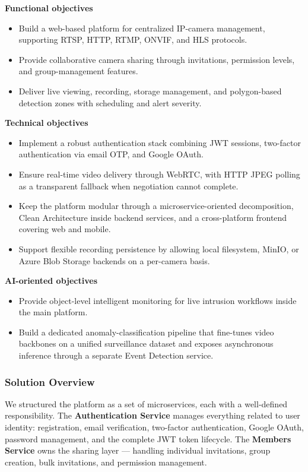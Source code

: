 \documentclass[12pt,a4paper,oneside]{report}
\begin{document}
\textbf{Functional objectives}
\begin{itemize}
  \item Build a web-based platform for centralized IP-camera management, supporting RTSP, HTTP, RTMP, ONVIF, and HLS protocols.
  \item Provide collaborative camera sharing through invitations, permission levels, and group-management features.
  \item Deliver live viewing, recording, storage management, and polygon-based detection zones with scheduling and alert severity.
\end{itemize}

\textbf{Technical objectives}
\begin{itemize}
  \item Implement a robust authentication stack combining JWT sessions, two-factor authentication via email OTP, and Google OAuth.
  \item Ensure real-time video delivery through WebRTC, with HTTP JPEG polling as a transparent fallback when negotiation cannot complete.
  \item Keep the platform modular through a microservice-oriented decomposition, Clean Architecture inside backend services, and a cross-platform frontend covering web and mobile.
  \item Support flexible recording persistence by allowing local filesystem, MinIO, or Azure Blob Storage backends on a per-camera basis.
\end{itemize}

\textbf{AI-oriented objectives}
\begin{itemize}
  \item Provide object-level intelligent monitoring for live intrusion workflows inside the main platform.
  \item Build a dedicated anomaly-classification pipeline that fine-tunes video backbones on a unified surveillance dataset and exposes asynchronous inference through a separate Event Detection service.
\end{itemize}

\subsubsection{Solution Overview}
\hspace{0.8cm}We structured the platform as a set of microservices, each with a well-defined responsibility. The \textbf{Authentication Service} manages everything related to user identity: registration, email verification, two-factor authentication, Google OAuth, password management, and the complete JWT token lifecycle. The \textbf{Members Service} owns the sharing layer — handling individual invitations, group creation, bulk invitations, and permission management.
\end{document}
